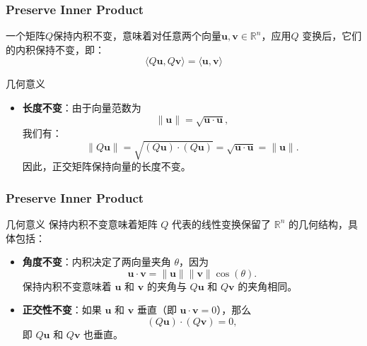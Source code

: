 \documentclass[aspectratio=169, UTF8]{ctexbeamer}
\begin{document}
\begin{frame}
    \frametitle{Preserve Inner Product}
    \begin{definition}
        一个矩阵$Q$保持内积不变，意味着对任意两个向量$ \mathbf{u}, \mathbf{v} \in \mathbb{R}^n $，应用$Q$ 变换后，它们的内积保持不变，即：
        \begin{equation*}
            \langle Q\mathbf{u}, Q\mathbf{v} \rangle = \langle \mathbf{u}, \mathbf{v} \rangle
        \end{equation*}
    \end{definition}
    \begin{block}{几何意义}
        \begin{itemize}
            \item \textbf{长度不变}：由于向量范数为
                  \[
                      \|\mathbf{u}\| = \sqrt{\mathbf{u} \cdot \mathbf{u}},
                  \]
                  我们有：
                  \[
                      \|Q\mathbf{u}\| = \sqrt{(Q\mathbf{u}) \cdot (Q\mathbf{u})} = \sqrt{\mathbf{u} \cdot \mathbf{u}} = \|\mathbf{u}\|.
                  \]
                  因此，正交矩阵保持向量的长度不变。

        \end{itemize}
    \end{block}
\end{frame}

\begin{frame}
    \frametitle{Preserve Inner Product}
    \begin{block}{几何意义}
        保持内积不变意味着矩阵 $Q$ 代表的线性变换保留了 $\mathbb{R}^n$ 的几何结构，具体包括：

        \begin{itemize}
            \item \textbf{角度不变}：内积决定了两向量夹角 $\theta$，因为
                  \[
                      \mathbf{u} \cdot \mathbf{v} = \|\mathbf{u}\| \|\mathbf{v}\| \cos(\theta).
                  \]
                  保持内积不变意味着 $\mathbf{u}$ 和 $\mathbf{v}$ 的夹角与 $Q\mathbf{u}$ 和 $Q\mathbf{v}$ 的夹角相同。

            \item \textbf{正交性不变}：如果 $\mathbf{u}$ 和 $\mathbf{v}$ 垂直（即 $\mathbf{u} \cdot \mathbf{v} = 0$），那么
                  \[
                      (Q\mathbf{u}) \cdot (Q\mathbf{v}) = 0,
                  \]
                  即 $Q\mathbf{u}$ 和 $Q\mathbf{v}$ 也垂直。
        \end{itemize}
    \end{block}
\end{frame}
\end{document}
